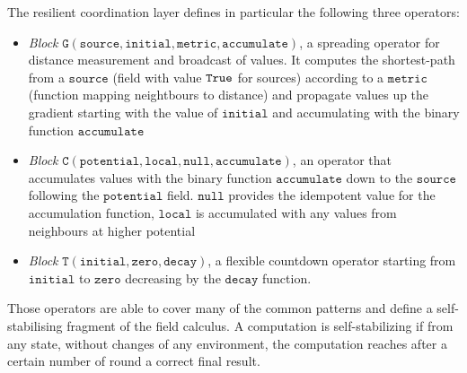 The resilient coordination layer defines in particular the following three operators:
\begin{itemize}
\item \textit{Block} $\mathtt{G(source, initial, metric, accumulate)}$, a spreading operator for distance measurement and broadcast of values. It computes the shortest-path from a $\mathtt{source}$ (field with value $\mathtt{True}$ for sources) according to a $\mathtt{metric}$ (function mapping neightbours to distance) and propagate values up the gradient starting with the value of $\mathtt{initial}$ and accumulating with the binary function $\mathtt{accumulate}$
\item \textit{Block} $\mathtt{C(potential, local, null, accumulate)}$, an operator that accumulates values with the binary function $\mathtt{accumulate}$ down to the $\mathtt{source}$ following the $\mathtt{potential}$ field. $\mathtt{null}$ provides the idempotent value for the accumulation function, $\mathtt{local}$ is accumulated with any values from neighbours at higher potential
\item \textit{Block} $\mathtt{T(initial, zero, decay)}$, a flexible countdown operator starting from $\mathtt{initial}$ to $\mathtt{zero}$ decreasing by the $\mathtt{decay}$ function.
\end{itemize}

Those operators are able to cover many of the common patterns and define a self-stabilising fragment of the field calculus. A computation is self-stabilizing if from any state, without changes of any environment, the computation reaches after a certain number of round a correct final result.
